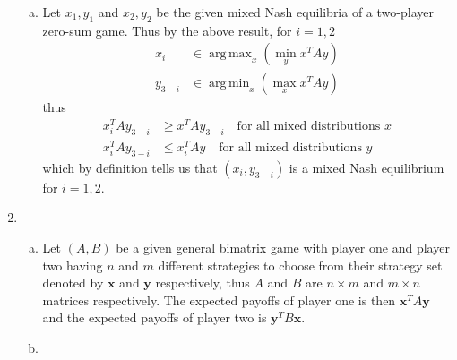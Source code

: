\documentclass[a4paper,12pt]{article}
\theoremstyle{definition}
\DeclareMathOperator*{\argmax}{arg\,max}
\DeclareMathOperator*{\argmin}{arg\,min}
\begin{document}
\begin{enumerate}
\begin{enumerate}[(a)]
\item Let $x_1,y_1$ and $x_2,y_2$ be the given mixed Nash equilibria of a two-player zero-sum game. Thus by the above result, for $i=1,2$
\begin{align*}
x_i &\in \argmax_x\left(\min_yx^TAy\right)\\
y_{3-i} & \in\argmin_x\left(\max_xx^TAy\right)
\end{align*}
thus
\begin{align*}
x_i^TAy_{3-i}&\geq x^TAy_{3-i} \quad \text{for all mixed distributions $x$}\\
x_i^TAy_{3-i}&\leq x_i^TAy_{} \quad \text{for all mixed distributions $y$}
\end{align*}
which by definition tells us that $(x_i,y_{3-i})$ is a mixed Nash equilibrium for $i=1,2$.
\end{enumerate}

\item
\begin{enumerate}[(a)]
\item Let $(A,B)$ be a given general bimatrix game with player one and player two having $n$ and $m$ different strategies to choose from their strategy set denoted by $\mathbf{x}$ and $\mathbf{y}$ respectively, thus $A$ and $B$ are $n \times m$ and $m \times n$ matrices respectively. The expected payoffs of player one is then  $\mathbf{x}^TA\mathbf{y}$ and the expected payoffs of player two is $\mathbf{y}^TB\mathbf{x}$.
\item
\end{enumerate}


\end{enumerate}
\end{document}
